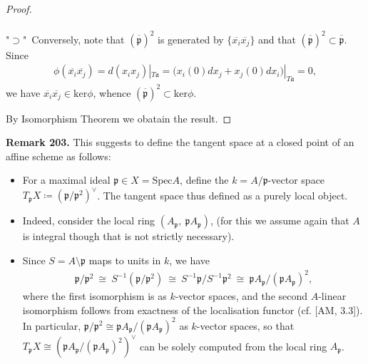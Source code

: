 \documentclass[12pt,a4paper,footinclude=true,headinclude=true]{scrbook} %
\newenvironment{remark}[2][Remark]
    { \begin{mdframed}[backgroundcolor=gray!20] \textbf{#1 #2.} }
    {  \end{mdframed}}
\begin{document}
\begin{proof}
\begin{itemize}
\begin{align*}
        \end{align*}
        "$\supset$"\ Conversely, note that $(\overline{\mathfrak{p}})^2$ is generated by $\{\overline{x_i}\overline{x_j}\}$ and that $(\overline{\mathfrak{p}})^2\subset\overline{\mathfrak{p}}$. Since
        \begin{align*}
            \phi(\overline{x_i}\overline{x_j})=d(x_ix_j)|_{T\mathfrak{a}}=\big(x_i(0)dx_j+x_j(0)dx_i\big)|_{T\mathfrak{a}}=0,
        \end{align*}
        we have $\overline{x_i}\overline{x_j}\in\mathrm{ker}\phi$, whence $(\overline{\mathfrak{p}})^2\subset\mathrm{ker}\phi$.
    \end{itemize}
    By Isomorphism Theorem we obatain the result.
\end{proof}

\begin{remark}{203}
    This suggests to define the tangent space at a closed point of an affine scheme as follows:
    \begin{itemize}
        \item For a maximal ideal $\mathfrak{p}\in X=\mathrm{Spec}A$, define the $k=A/\mathfrak{p}$-vector space $T_\mathfrak{p}X\coloneqq(\mathfrak{p}/\mathfrak{p}^2)^\vee$. The tangent space thus defined as a purely local object.
        \item Indeed, consider the local ring $(A_\mathfrak{p},\ \mathfrak{p}A_\mathfrak{p})$, (for this we assume again that $A$ is integral though that is not strictly necessary). 
        \item Since $S=A\setminus\mathfrak{p}$ maps to units in $k$, we have
        \begin{align*}
            \mathfrak{p}/\mathfrak{p}^2\ \cong\ S^{-1}(\mathfrak{p}/\mathfrak{p}^2)\ \cong\ S^{-1}\mathfrak{p}/S^{-1}\mathfrak{p}^2\ \cong\ \mathfrak{p}A_\mathfrak{p}/(\mathfrak{p}A_\mathfrak{p})^2,
        \end{align*}
        where the first isomorphism is as $k$-vector spaces, and the second $A$-linear isomorphism follows from exactness of the localisation functor (cf. [AM, 3.3]). In particular, $\mathfrak{p}/\mathfrak{p}^2\cong\mathfrak{p}A_\mathfrak{p}/(\mathfrak{p}A_\mathfrak{p})^2$ as $k$-vector spaces, so that $T_\mathfrak{p}X\cong(\mathfrak{p}A_\mathfrak{p}/(\mathfrak{p}A_\mathfrak{p})^2)^\vee$ can be solely computed from the local ring $A_\mathfrak{p}$.
    \end{itemize}
\end{remark}
\end{document}
